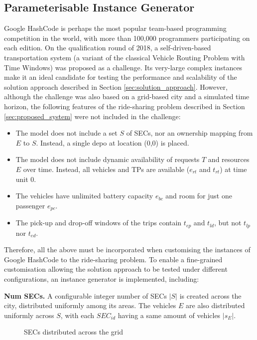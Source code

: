 \subsection{Parameterisable Instance Generator}
\label{parameterisable_instance_generator}

Google HashCode \cite{hashcode} is perhaps the most popular team-based programming competition in the world, with more than 100,000 programmers participating on each edition. On the qualification round of 2018, a self-driven-based transportation system (a variant of the classical Vehicle Routing Problem with Time Windows) was proposed as a challenge.  Its very-large complex instances make it an ideal candidate for testing the performance and scalability of the solution approach described in Section \ref{sec:solution_approach}. However, although the challenge was also based on a grid-based city and a simulated time horizon, the following features of the ride-sharing problem described in Section \ref{sec:proposed_system} were not included in the challenge:
\begin{itemize}
\item The model does not include a set $S$ of SECs, nor an ownership mapping from $E$ to $S$. Instead, a single depo at location (0,0) is placed. 
\item The model does not include dynamic availability of requests $T$ and resources $E$ over time. Instead, all vehicles and TPs are available ($e_{rt}$ and $t_{rt}$) at time unit 0.  
\item The vehicles have unlimited battery capacity $e_{bc}$ and room for just one passenger $e_{pc}$. 
\item The pick-up and drop-off windows of the trips contain $t_{ep}$ and $t_{ld}$, but not $t_{lp}$ nor $t_{ed}$. 
\end{itemize}

Therefore, all the above must be incorporated when customising the instances of Google HashCode to the ride-sharing problem.  To enable a fine-grained customisation allowing the solution approach to be tested under different configurations,  an instance generator is implemented, including: 

\textbf{Num SECs.} A configurable integer number of SECs $|S|$ is created across the city, distributed uniformly among its areas.  The vehicles $E$ are also distributed uniformly across $S$, with each $SEC_{id}$ having a same amount of vehicles 
$|s_E|$. 

\begin{figure}[t]
  \vspace{-0.2cm}
  \centering
   {}
  \caption{SECs distributed across the grid}
  \label{fig:sched_AEV_1_TP_2}
  \vspace{-0.1cm}
\end{figure}

